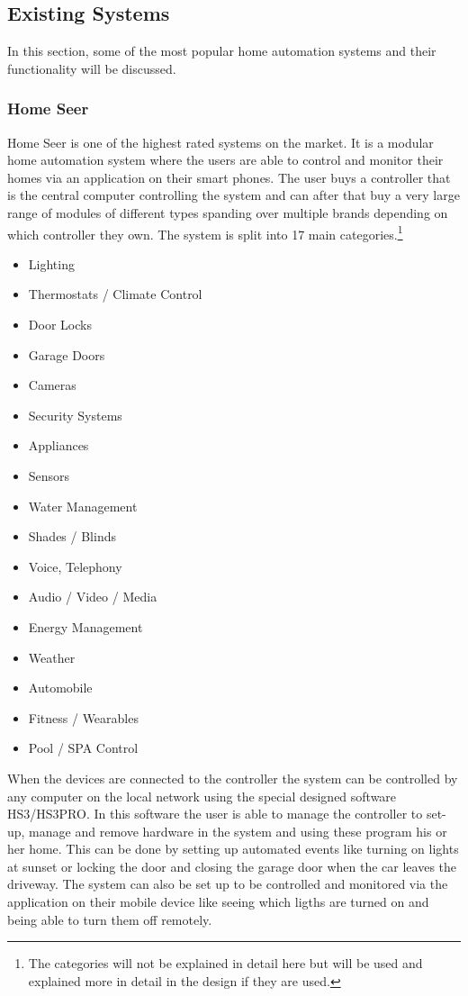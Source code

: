 \subsection{Existing Systems}
In this section, some of the most popular home automation systems and their functionality will be discussed.
\subsubsection{Home Seer}
Home Seer is one of the highest rated systems on the market. It is a modular home automation system where the users are able to control and monitor their homes via an application on their smart phones. The user buys a controller that is the central computer controlling the system and can after that buy a very large range of modules of different types spanding over multiple brands depending on which controller they own. The system is split into 17 main categories.\footnote{The categories will not be explained in detail here but will be used and explained more in detail in the design if they are used.}
\begin{itemize}
	\item Lighting
	\item Thermostats / Climate Control
	\item Door Locks
	\item Garage Doors
	\item Cameras
	\item Security Systems
	\item Appliances
	\item Sensors
	\item Water Management
	\item Shades / Blinds
	\item Voice, Telephony
	\item Audio / Video / Media
	\item Energy Management
	\item Weather
	\item Automobile
	\item Fitness / Wearables
	\item Pool / SPA Control
\end{itemize}%
When the devices are connected to the controller the system can be controlled by any computer on the local network using the special designed software HS3/HS3PRO. In this software the user is able to manage the controller to set-up, manage and remove hardware in the system and using these program his or her home. This can be done by setting up automated events like turning on lights at sunset or locking the door and closing the garage door when the car leaves the driveway. The system can also be set up to be controlled and monitored via the application on their mobile device like seeing which ligths are turned on and being able to turn them off remotely.%

